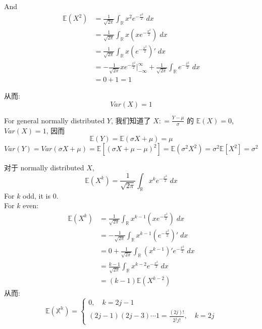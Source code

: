 And  \begin{align}
    \mathbb{E}(X^2) &=  \frac{1}{\sqrt{2\pi }} \int _{\mathbb{R}} x^2   e^{-\frac{x^2}{2}}    \; dx   \\
    &= \frac{1}{\sqrt{2\pi }} \int _{\mathbb{R}} x (x  e^{-\frac{x^2}{2}})    \; dx \\
    &= \frac{1}{\sqrt{2\pi }} \int _{\mathbb{R}} x   ( e^{-\frac{x^2}{2}} )'   \; dx   \\
    & = - \frac{1}{\sqrt{2\pi }}  x e^{-\frac{x^2}{2}} \bigg|^\infty_{-\infty}  +  \frac{1}{\sqrt{2\pi }} \int _{\mathbb{R}}  e^{-\frac{x^2}{2}}    \; dx \\
    &= 0 + 1 = 1
\end{align}

从而: \[
Var(X) = 1
\]




For general normally distributed $Y$, 我们知道了 $X : = \frac{Y - \mu}{\sigma}$ 的 $\mathbb{E}(X)  = 0$, $Var(X) = 1$, 因而 \[
\mathbb{E}(Y) = \mathbb{E}(\sigma X + \mu)   = \mu
\]
\[
Var(Y)  = Var(\sigma X + \mu) =  \mathbb{E}[(\sigma X + \mu - \mu)^2] = \mathbb{E} (\sigma^2 X^2) = \sigma^2 \mathbb{E}[X^2] = \sigma^2 
\]

\begin{remark}
    对于 normally distributed $X$, 
    \[ \mathbb{E}(X^k) =  \frac{1}{\sqrt{2\pi}} \int_\mathbb{R} x^k  e^{-\frac{x^2}{2}}  \; dx  \]
    For $k$ odd, it is $0$.\\
    For $k$ even:
  \begin{align}
      \mathbb{E}(X^k) &=  \frac{1}{\sqrt{2\pi}} \int_\mathbb{R} x^{k-1} (x e^{-\frac{x^2}{2}})  \; dx  \\
      & = -\frac{1}{\sqrt{2\pi}} \int_\mathbb{R} x^{k-1} ( e^{-\frac{x^2}{2}}) ' \; dx \\
      &= 0 + \frac{1}{\sqrt{2\pi}} \int_\mathbb{R} (x^{k-1})' e^{-\frac{x^2}{2}} \;dx \\
      & = \frac{k-1}{\sqrt{2\pi}} \int_\mathbb{R} x^{k-2} e^{-\frac{x^2}{2}} \;dx  \\
      & = (k-1) \mathbb{E}(X^{k-2})
   \end{align}  
   从而: \[
   \mathbb{E(X^k )} = \begin{cases}
       0 ,\quad k = 2j-1 \\
       (2j-1)(2j-3)\cdots 1 = \frac{(2j)!}{2^j j!},\quad k=2j
   \end{cases}
   \]
\end{remark}





